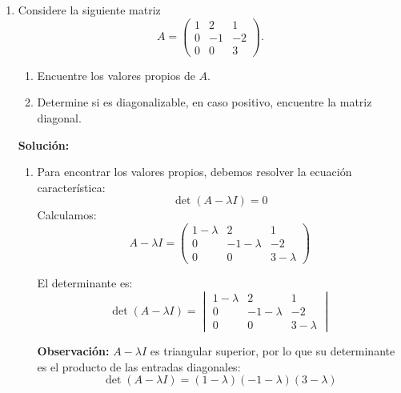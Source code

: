\documentclass[a4paper]{article}
\begin{document}
\begin{enumerate}
Calculando el determinante de la matriz \( A \) para verificar si los vectores columna son linealmente independientes:

\[
\det(A) = 
\begin{vmatrix}
-2 & 1 & -1 & 0 \\
1 & -1 & 0 & -3 \\
1 & 0 & 1 & 1 \\
0 & 2 & 2 & 2
\end{vmatrix}=0
\]h

Lo cual implica que el conjunto es \textbf{linealmente dependiente}.


\item Considere la siguiente matriz
\[    A=\begin{pmatrix} 1 &2 & 1 \\ 0 & -1 & -2 \\ 0 & 0 & 3 \end{pmatrix}.\]
\begin{enumerate}
    \item Encuentre los valores propios de $A$.
    \item Determine si es diagonalizable, en caso positivo, encuentre la matriz diagonal.
\end{enumerate}

\textbf{Solución:}

\begin{enumerate}
    \item 

 Para encontrar los valores propios, debemos resolver la ecuación característica:
    \[
    \det(A - \lambda I) = 0
    \]
    Calculamos:
    \[
    A - \lambda I = 
    \begin{pmatrix}
    1 - \lambda & 2 & 1 \\
    0 & -1 - \lambda & -2 \\
    0 & 0 & 3 - \lambda
    \end{pmatrix}
    \]

    El determinante es:
    \[
    \det(A - \lambda I) = 
    \begin{vmatrix}
    1 - \lambda & 2 & 1 \\
    0 & -1 - \lambda & -2 \\
    0 & 0 & 3 - \lambda
    \end{vmatrix}
    \]

    \textbf{Observación:} \( A - \lambda I \) es triangular superior, por lo que su determinante es el producto de las entradas diagonales:
    \[
    \det(A - \lambda I) = (1 - \lambda)(-1 - \lambda)(3 - \lambda)
    \]


\end{enumerate}
\end{enumerate}
\end{document}
